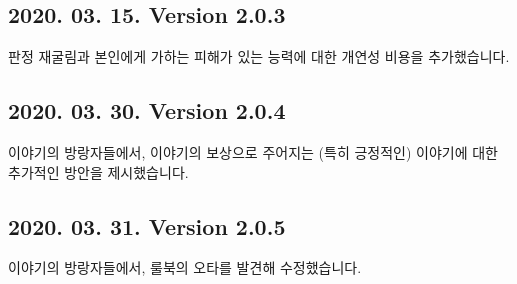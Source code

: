\documentclass{report}
\begin{document}
	\subsection*{2020. 03. 15. Version 2.0.3}
	판정 재굴림과 본인에게 가하는 피해가 있는 능력에 대한 개연성 비용을 추가했습니다.
	
	\subsection*{2020. 03. 30. Version 2.0.4}
	이야기의 방랑자들에서, 이야기의 보상으로 주어지는 (특히 긍정적인) 이야기에 대한 추가적인 방안을 제시했습니다.
\fi
	
	\subsection*{2020. 03. 31. Version 2.0.5}
	이야기의 방랑자들에서, 룰북의 오타를 발견해 수정했습니다.
\end{document}
